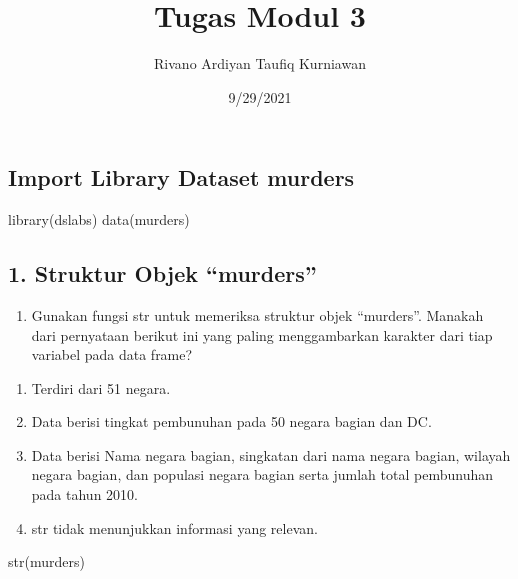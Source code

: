 \documentclass[
]{article}
\title{Tugas Modul 3}
\author{Rivano Ardiyan Taufiq Kurniawan}
\date{9/29/2021}
\newenvironment{Shaded}{\begin{snugshade}}{\end{snugshade}}
\newcommand{\FunctionTok}[1]{\textcolor[rgb]{0.00,0.00,0.00}{#1}}
\newcommand{\NormalTok}[1]{#1}
\providecommand{\tightlist}{%
  \setlength{\itemsep}{0pt}\setlength{\parskip}{0pt}}
\begin{document}
\maketitle

\hypertarget{import-library-dataset-murders}{%
\subsection{Import Library Dataset
murders}\label{import-library-dataset-murders}}

\begin{Shaded}
\begin{Highlighting}[]
\FunctionTok{library}\NormalTok{(dslabs)}
\FunctionTok{data}\NormalTok{(murders) }
\end{Highlighting}
\end{Shaded}

\hypertarget{struktur-objek-murders}{%
\subsection{1. Struktur Objek
``murders''}\label{struktur-objek-murders}}

\begin{enumerate}
\def\labelenumi{\arabic{enumi}.}
\tightlist
\item
  Gunakan fungsi str untuk memeriksa struktur objek ``murders''. Manakah
  dari pernyataan berikut ini yang paling menggambarkan karakter dari
  tiap variabel pada data frame?
\end{enumerate}

\begin{enumerate}
\def\labelenumi{\alph{enumi}.}
\tightlist
\item
  Terdiri dari 51 negara.
\item
  Data berisi tingkat pembunuhan pada 50 negara bagian dan DC.
\item
  Data berisi Nama negara bagian, singkatan dari nama negara bagian,
  wilayah negara bagian, dan populasi negara bagian serta jumlah total
  pembunuhan pada tahun 2010.
\item
  str tidak menunjukkan informasi yang relevan.
\end{enumerate}

\begin{Shaded}
\begin{Highlighting}[]
\FunctionTok{str}\NormalTok{(murders)}
\end{Highlighting}
\end{Shaded}
\end{document}
